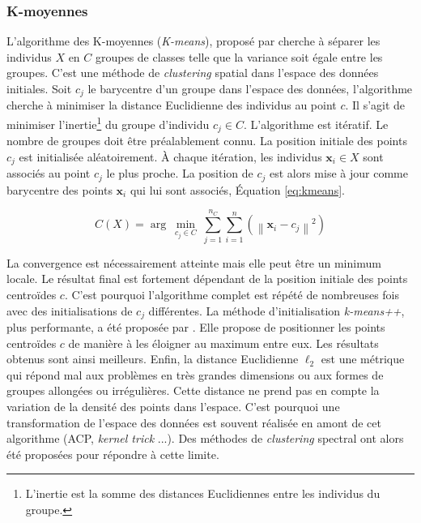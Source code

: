 \subsubsection{K-moyennes} \label{subsubsec:kmeans}
L'algorithme des K-moyennes (\textit{K-means}), proposé par \citeauthor{macqueen_methods_1967} \cite{macqueen_methods_1967, lloyd_least_1982} cherche à séparer les individus $X$ en $C$ groupes de classes telle que la variance soit égale entre les groupes.
C'est une méthode de \textit{clustering} spatial dans l'espace des données initiales.
Soit $c_j$ le barycentre d'un groupe dans l'espace des données, l'algorithme cherche à minimiser la distance Euclidienne des individus au point $c$.
Il s'agit de minimiser l'inertie\footnote{L'inertie est la somme des distances Euclidiennes entre les individus du groupe.} du groupe d'individu $c_j \in C$.
L'algorithme est itératif.
Le nombre de groupes doit être préalablement connu.
La position initiale des points $c_j$ est initialisée aléatoirement.
À chaque itération, les individus $\mathbf{x}_i \in X$ sont associés au point $c_j$ le plus proche.
La position de $c_j$ est alors mise à jour comme barycentre des points $\mathbf{x}_i$ qui lui sont associés, Équation \ref{eq:kmeans}.

\begin{equation} \label{eq:kmeans}
C(X) = \arg \ \min _{c_{j} \in C} \ \sum_{j=1}^{n_C} \sum_{i=1}^{n} \left(\left\|\mathbf{x}_{i}-c_{j}\right\|^{2}\right)
\end{equation}

La convergence est nécessairement atteinte mais elle peut être un minimum locale.
Le résultat final est fortement dépendant de la position initiale des points centroïdes $c$.
C'est pourquoi l'algorithme complet est répété de nombreuses fois avec des initialisations de $c_j$ différentes.
La méthode d'initialisation \textit{k-means++}, plus performante, a été proposée par \citeauthor{arthur_kmeans_2007} \cite{arthur_kmeans_2007}. Elle propose de positionner les points centroïdes $c$ de manière à les éloigner au maximum entre eux. Les résultats obtenus sont ainsi meilleurs.
Enfin, la distance Euclidienne $\ell_{2}$ est une métrique qui répond mal aux problèmes en très grandes dimensions ou aux formes de groupes allongées ou irrégulières.
Cette distance ne prend pas en compte la variation de la densité des points dans l'espace.
C'est pourquoi une transformation de l'espace des données est souvent réalisée en amont de cet algorithme (ACP, \textit{kernel trick} ...).
Des méthodes de \textit{clustering} spectral ont alors été proposées pour répondre à cette limite.

